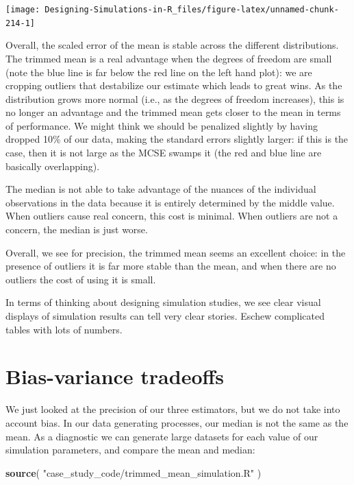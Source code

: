 \documentclass[
]{book}
\newenvironment{Shaded}{\begin{snugshade}}{\end{snugshade}}
\newcommand{\FunctionTok}[1]{\textcolor[rgb]{0.13,0.29,0.53}{\textbf{#1}}}
\newcommand{\NormalTok}[1]{#1}
\newcommand{\StringTok}[1]{\textcolor[rgb]{0.31,0.60,0.02}{#1}}
\begin{document}
\begin{center}\texttt{[image: Designing-Simulations-in-R\_files/figure-latex/unnamed-chunk-214-1]} \end{center}

Overall, the scaled error of the mean is stable across the different distributions.
The trimmed mean is a real advantage when the degrees of freedom are small (note the blue line is far below the red line on the left hand plot): we are cropping outliers that destabilize our estimate which leads to great wins.
As the distribution grows more normal (i.e., as the degrees of freedom increases), this is no longer an advantage and the trimmed mean gets closer to the mean in terms of
performance.
We might think we should be penalized slightly by having dropped 10\% of our data, making the standard errors slightly larger: if this is the case, then it is not large as the MCSE swamps it (the red and blue line are basically overlapping).

The median is not able to take advantage of the nuances of the individual observations in the data because it is entirely determined by the middle value.
When outliers cause real concern, this cost is minimal. When outliers are not a concern, the median is just worse.

Overall, we see for precision, the trimmed mean seems an excellent choice: in the presence of
outliers it is far more stable than the mean, and when there are no outliers
the cost of using it is small.

In terms of thinking about designing simulation studies, we see clear
visual displays of simulation results can tell very clear stories. Eschew
complicated tables with lots of numbers.

\section{Bias-variance tradeoffs}\label{bias-variance-tradeoffs}

We just looked at the precision of our three estimators, but we do not take into account bias.
In our data generating processes, our median is not the same as the mean.
As a diagnostic we can generate large datasets for each value of our simulation parameters, and compare the mean and median:

\begin{Shaded}
\begin{Highlighting}[]
\FunctionTok{source}\NormalTok{( }\StringTok{"case\_study\_code/trimmed\_mean\_simulation.R"}\NormalTok{ )}
\end{Highlighting}
\end{Shaded}
\end{document}
